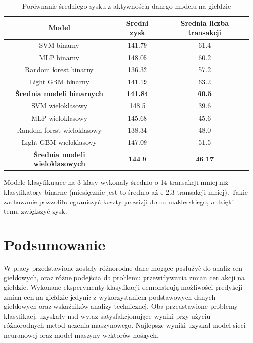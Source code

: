 \documentclass[a4paper, twoside, 11pt, openright]{article}
\begin{document}
 \begin{table}[H]
    \centering
    \begin{tabular}{|c|c|c|}
    \hline
        \textbf{Model}  & \textbf{Średni zysk} & \textbf{Średnia liczba transakcji}\\ \hline
            SVM binarny & 141.79 & 61.4 \\ \hline
            MLP binarny & 148.05 & 60.2 \\ \hline
            Random forest binarny & 136.32 & 57.2 \\ \hline
            Light GBM binarny & 141.19 & 63.2 \\ \hline 
            \textbf{Średnia modeli binarnych} & \textbf{141.84} & \textbf{60.5} \\ \hline \hline
            
            SVM wieloklasowy & 148.5 & 39.6 \\ \hline
            MLP wieloklasowy & 145.68 & 45.6 \\ \hline
            Random forest wieloklasowy & 138.34 & 48.0 \\ \hline
            Light GBM wieloklasowy & 147.09 & 51.5 \\ \hline
            \textbf{Średnia modeli wieloklasowych} & \textbf{144.9} & \textbf{46.17} \\ \hline
    \end{tabular}
    \caption{Porównanie średniego zysku z aktywnością danego modelu na giełdzie}
    \label{tab:simulation_avg_value_vs_transactions}
\end{table} 

 Modele klasyfikujące na 3 klasy wykonały średnio o 14 transakcji mniej niż klasyfikatory binarne (miesięcznie jest to średnio aż o 2.3 transakcji mniej). Takie zachowanie pozwoliło ograniczyć koszty prowizji domu maklerskiego, a dzięki temu zwiększyć zysk.

\section{Podsumowanie}

W pracy przedstawione zostały różnorodne dane mogące posłużyć do analiz cen giełdowych, oraz różne podejścia do problemu przewidywania zmian cen akcji na giełdzie. Wykonane eksperymenty klasyfikacji demonstrują możliwości predykcji zmian cen na giełdzie jedynie z wykorzystaniem podstawowych danych giełdowych oraz wskaźników analizy technicznej. Oba przedstawione problemy klasyfikacji uzyskały nad wyraz satysfakcjonujące wyniki przy użyciu różnorodnych metod uczenia maszynowego. Najlepsze wyniki uzyskał model sieci neuronowej oraz model maszyny wektorów nośnych.
\end{document}
